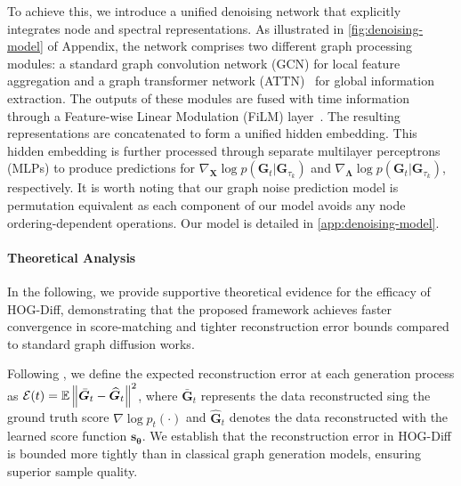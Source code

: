 To achieve this, we introduce a unified denoising network that explicitly integrates node and spectral representations. 
As illustrated in \cref{fig:denoising-model} of Appendix, the network comprises two different graph processing modules: a standard graph convolution network (GCN) \cite{GCN+ICLR2017} for local feature aggregation and a graph transformer network (ATTN)~ \cite{TFmodel2021AAAIworkshop,DiGress+ICLR2023} for global information extraction.
The outputs of these modules are fused with time information through a Feature-wise Linear Modulation (FiLM) layer~\cite{Film+AAAI2018}. The resulting representations are concatenated to form a unified hidden embedding.
This hidden embedding is further processed through separate multilayer perceptrons (MLPs) to produce predictions for $\nabla_{\bm{X}} \log p(\bm{G}_t|\bm{G}_{\tau_k})$ and $\nabla_{\bm{\Lambda}} \log p(\bm{G}_t|\bm{G}_{\tau_k})$, respectively.
%
It is worth noting that our graph noise prediction model is permutation equivalent as each component of our model avoids any node ordering-dependent operations.
%
Our model is detailed in \cref{app:denoising-model}.






\paragraph{Theoretical Analysis}
In the following, we provide supportive theoretical evidence for the efficacy of HOG-Diff, demonstrating that the proposed framework achieves faster convergence in score-matching and tighter reconstruction error bounds compared to standard graph diffusion works.

\begin{proposition}[Informal]
\label{pro:training}

\end{proposition}



Following \citet{GSDM+TPAMI2023},  we define the expected reconstruction error at each generation process as $\mathcal{E}(t)=\mathbb{E}\left\|\bar{\bm{G}}_t-\widehat{\bm{G}}_t\right\|^2$, where $\bar{\bm{G}}_t$ represents the data reconstructed sing the ground truth score $\nabla \log p_t(\cdot)$ and $\widehat{\bm{G}}_t$ denotes the data reconstructed with the learned score function $\bm{s}_{\bm{\theta}}$.
We establish that the reconstruction error in HOG-Diff is bounded more tightly than in classical graph generation models, ensuring superior sample quality.
\begin{proposition}
\label{pro:reconstruction-error}

\end{proposition}


